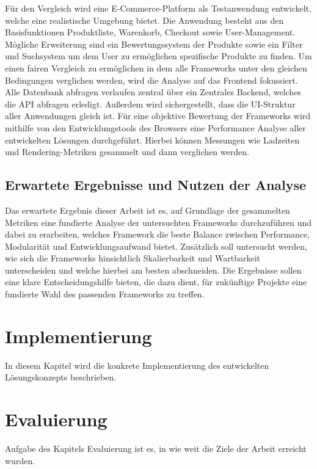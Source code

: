 \documentclass[oneside]{ausarbeitung}
\begin{document}
Für den Vergleich wird eine E-Commerce-Platform als Testanwendung entwickelt, welche eine realistische Umgebung bietet. Die Anwendung besteht aus den Basisfunktionen Produktliste, Warenkorb, Checkout sowie User-Management. Mögliche Erweiterung sind ein Bewertungssystem der Produkte sowie ein Filter und Suchsystem um dem User zu ermöglichen spezifische Produkte zu finden. 
Um einen fairen Vergleich zu ermöglichen in dem alle Frameworks unter den gleichen Bedingungen verglichen werden, wird die Analyse auf das Frontend fokussiert. Alle Datenbank abfragen verlaufen zentral über ein Zentrales Backend, welches die API abfragen erledigt. 
Außerdem wird sichergestellt, dass die UI-Struktur aller Anwendungen gleich ist. 
Für eine objektive Bewertung der Frameworks wird mithilfe von den Entwicklungstools des Browsers eine Performance Analyse aller entwickelten Lösungen durchgeführt. Hierbei können Messungen wie Ladzeiten und Rendering-Metriken gesammelt und dann verglichen werden. 

\section{Erwartete Ergebnisse und Nutzen der Analyse}

Das erwartete Ergebnis dieser Arbeit ist es, auf Grundlage der gesammelten Metriken eine fundierte Analyse der untersuchten Frameworks durchzuführen und dabei zu erarbeiten, welches Framework die beste Balance zwischen Performance, Modularität und Entwicklungsaufwand bietet.
Zusätzlich soll untersucht werden, wie sich die Frameworks hinsichtlich Skalierbarkeit und Wartbarkeit unterscheiden und welche hierbei am besten abschneiden.
Die Ergebnisse sollen eine klare Entscheidungshilfe bieten, die dazu dient, für zukünftige Projekte eine fundierte Wahl des passenden Frameworks zu treffen.

\chapter{Implementierung}
\label{cha:implementierung}

In diesem Kapitel wird die konkrete Implementierung des entwickelten Lösungskonzepts beschrieben.

\chapter{Evaluierung}

Aufgabe des Kapitels Evaluierung ist es, in wie weit die Ziele der Arbeit erreicht wurden.
\end{document}
